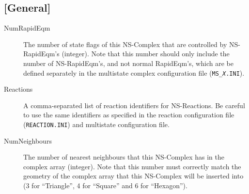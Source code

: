 \subsection{[General]}
\begin{description}
\item[NumRapidEqm] The number of state flags of this NS-Complex that
  are controlled by NS-RapidEqm's (integer).  Note that this number
  should only include the number of NS-RapidEqm's, and not normal
  RapidEqm's, which are be defined separately in the multistate
  complex configuration file (\texttt{MS\_\emph{X}.INI}).
  
\item[Reactions] A comma-separated list of reaction identifiers for
  NS-Reactions.  Be careful to use the same identifiers as specified
  in the reaction configuration file (\texttt{REACTION.INI}) and multistate
  configuration file.
  
\item[NumNeighbours] The number of nearest neighbours that this
  NS-Complex has in the complex array (integer). Note that
  this number must correctly match the geometry of the complex array
  that this NS-Complex will be inserted into (3 for ``Triangle'', 4
  for ``Square'' and 6 for ``Hexagon'').  
\end{description}

